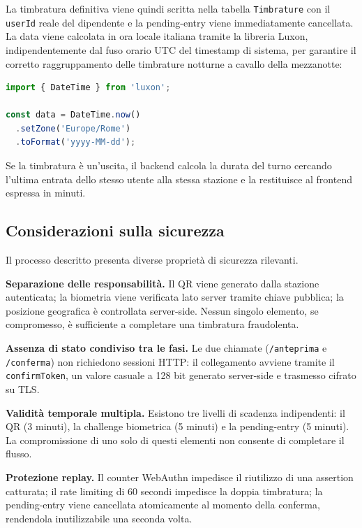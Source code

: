 La timbratura definitiva viene quindi scritta nella tabella
\texttt{Timbrature} con il \texttt{userId} reale del dipendente e la
pending-entry viene immediatamente cancellata. La data viene calcolata
in ora locale italiana tramite la libreria Luxon, indipendentemente dal
fuso orario UTC del timestamp di sistema, per garantire il corretto
raggruppamento delle timbrature notturne a cavallo della mezzanotte:

\begin{lstlisting}[language=TypeScript,caption={Calcolo della data locale.}]
import { DateTime } from 'luxon';

const data = DateTime.now()
  .setZone('Europe/Rome')
  .toFormat('yyyy-MM-dd');
\end{lstlisting}

Se la timbratura è un'uscita, il backend calcola la durata del turno
cercando l'ultima entrata dello stesso utente alla stessa stazione e
la restituisce al frontend espressa in minuti.

\subsection{Considerazioni sulla sicurezza}
\label{subsec:sicurezza-timbratura}

Il processo descritto presenta diverse proprietà di sicurezza rilevanti.

\textbf{Separazione delle responsabilità.} Il QR viene generato dalla
stazione autenticata; la biometria viene verificata lato server tramite
chiave pubblica; la posizione geografica è controllata server-side. Nessun
singolo elemento, se compromesso, è sufficiente a completare una
timbratura fraudolenta.

\textbf{Assenza di stato condiviso tra le fasi.} Le due chiamate
(\texttt{/anteprima} e \texttt{/conferma}) non richiedono sessioni HTTP:
il collegamento avviene tramite il \texttt{confirmToken}, un valore
casuale a 128 bit generato server-side e trasmesso cifrato su \textsc{TLS}.

\textbf{Validità temporale multipla.} Esistono tre livelli di scadenza
indipendenti: il QR (3 minuti), la challenge biometrica (5 minuti) e la
pending-entry (5 minuti). La compromissione di uno solo di questi
elementi non consente di completare il flusso.

\textbf{Protezione replay.} Il counter WebAuthn impedisce il riutilizzo
di una assertion catturata; il rate limiting di 60 secondi impedisce la
doppia timbratura; la pending-entry viene cancellata atomicamente al
momento della conferma, rendendola inutilizzabile una seconda volta.
